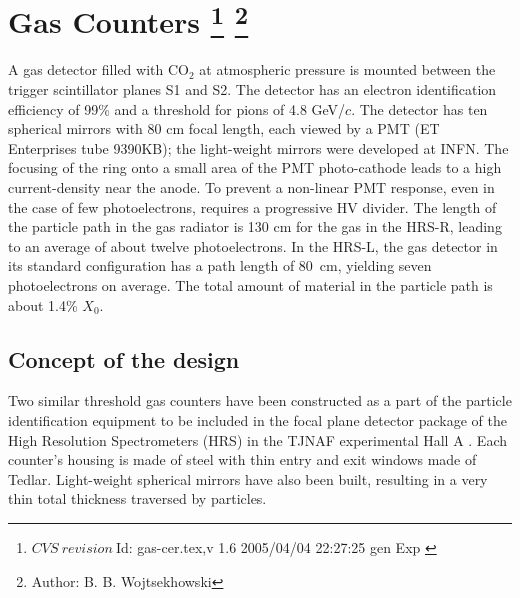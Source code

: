 \chapter[Gas \Cherenkov{} Counters]{Gas \Cherenkov{} Counters
\footnote{
  $CVS~revision~ $Id: gas-cer.tex,v 1.6 2005/04/04 22:27:25 gen Exp $ $
}
\footnote{Author: B. B. Wojtsekhowski }
}

A gas \Cherenkov{} detector filled  with CO$_{2}$ at atmospheric 
pressure is mounted between the trigger scintillator planes S1 and S2. 
The detector has an electron identification efficiency 
of 99\% and a threshold for pions of 4.8 GeV/$c$.
The detector has ten spherical mirrors with 80 cm focal length, each
viewed by a PMT (ET Enterprises tube 9390KB); the light-weight mirrors
were developed at INFN.
The focusing of the \Cherenkov{} ring onto a
small area of the PMT photo-cathode leads to a high current-density  near
the anode. To prevent a non-linear PMT response, even in the case of few
photoelectrons, requires a progressive HV divider.
The length of the particle path in the gas radiator is 130 cm for the gas
\Cherenkov{} in the HRS-R, leading to an average of about twelve photoelectrons.
In the HRS-L, the gas \Cherenkov{} detector in its standard configuration has
a path length of 80~cm, yielding seven photoelectrons on average.
The total amount of material in the particle path is about 1.4\% $X_0$.

\section[Concept of the design]{Concept of the design}

Two similar threshold gas \Cherenkov{} counters have been constructed 
as a part of the particle identification equipment to be included 
in the focal plane detector package of the High Resolution Spectrometers (HRS) 
in the TJNAF experimental Hall A%
. 
Each counter's housing is made of steel with thin entry and 
exit windows made of Tedlar\texttrademark{}.
Light-weight spherical mirrors have also been built, resulting in 
a very thin total thickness traversed by particles. 
%

